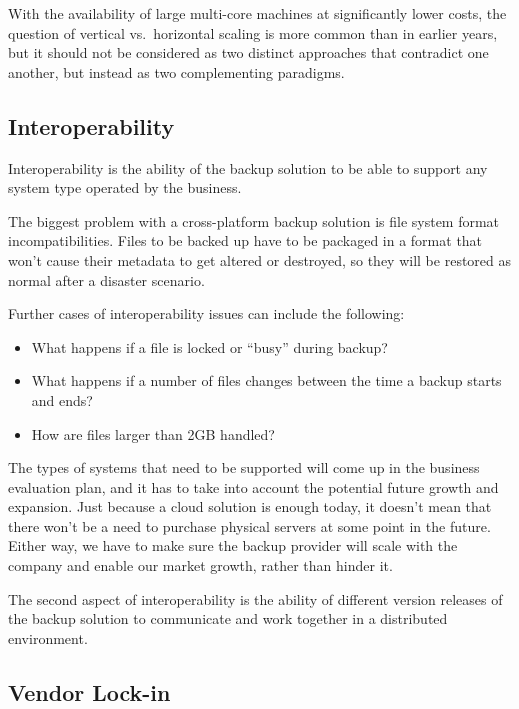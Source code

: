 With the availability of large multi-core machines at significantly
lower costs, the question of vertical vs.\ horizontal scaling is more
common than in earlier years, but it should not be considered as two
distinct approaches that contradict one another, but instead as two
complementing paradigms.



\subsection{Interoperability}

Interoperability is the ability of the backup solution to be able to
support any system type operated by the business.

The biggest problem with a cross-platform backup solution is file system
format incompatibilities. Files to be backed up have to be packaged in a
format that won't cause their metadata to get altered or destroyed, so
they will be restored as normal after a disaster scenario.

Further cases of interoperability issues can include the following:
\begin{itemize}
    \item What happens if a file is locked or ``busy'' during backup?
    \item What happens if a number of files changes between the time a backup starts and ends?
    \item How are files larger than 2GB handled?
\end{itemize}

The types of systems that need to be supported will come up in the
business evaluation plan, and it has to take into account the potential
future growth and expansion. Just because a cloud solution is enough
today, it doesn't mean that there won't be a need to purchase physical
servers at some point in the future. Either way, we have to make sure
the backup provider will scale with the company and enable our market
growth, rather than hinder it.

The second aspect of interoperability is the ability of different
version releases of the backup solution to communicate and work together
in a distributed environment.

\subsection{Vendor Lock-in}

